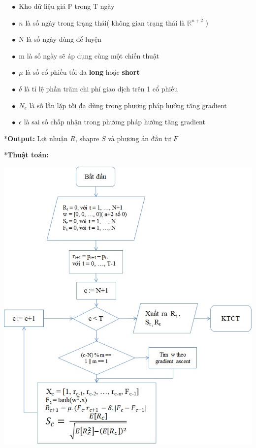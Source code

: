 \documentclass[14pt]{extreport}
\begin{document}
$\quad \bullet$ Kho dữ liệu giá $\mathbb{P}$ trong T ngày

$\quad \bullet $ $n$ là số ngày trong trạng thái( không gian trạng thái là $\mathbb{R}^{n+2}$ )

$\quad \bullet $ N là số ngày dùng để luyện

$\quad \bullet $ m là số ngày sẽ áp dụng cùng một chiến thuật

$\quad \bullet $ {\large $\mu$} là số cổ phiếu tối đa \textbf{long} hoặc \textbf{short} 

$\quad \bullet $ {\large $\delta$} là tỉ lệ phần trăm chi phí giao dịch trên 1 cổ phiếu 

$\quad \bullet $ $N_e$ là số lần lặp tối đa dùng trong phương pháp hướng tăng gradient

$\quad \bullet $ {\large $\epsilon$} là sai số chấp nhận trong phương pháp hướng tăng gradient


*\textbf{Output: } Lợi nhuận $\mathit{R}$, shapre $\mathit{S}$ và phương án đầu tư $\mathit{F}$ 

*\textbf{Thuật toán: }

\begin{center}
\includegraphics[scale=0.9]{Thuat_toan.jpg}
\end{center}
\end{document}
